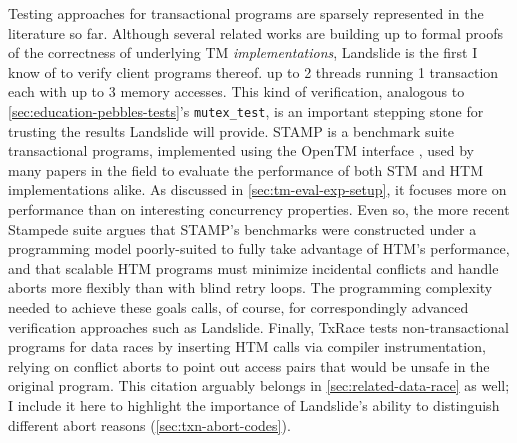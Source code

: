 Testing approaches for transactional programs are sparsely represented in the literature so far.
Although several related works \cite{tm-correctness,tm-completeness,specifying-verifying-tm}
are building up to formal proofs of the correctness of underlying TM {\em implementations},
Landslide is the first I know of to verify client programs thereof.
up to 2 threads running 1 transaction each with up to 3 memory accesses.
This kind of verification,
analogous to \cref{sec:education-pebbles-tests}'s {\tt mutex\_test},
is an important stepping stone for trusting the results Landslide will provide.
STAMP \cite{stamp} is a benchmark suite transactional programs,
implemented using the OpenTM interface \cite{opentm},
used by many papers in the field to evaluate the performance of both STM and HTM implementations alike.
As discussed in \cref{sec:tm-eval-exp-setup},
it focuses more on performance than on interesting concurrency properties.
Even so, the more recent Stampede suite \cite{scalable-tm} argues that STAMP's benchmarks
were constructed under a programming model poorly-suited to fully take advantage of HTM's performance,
and that scalable HTM programs must
minimize incidental conflicts and handle aborts more flexibly than with blind retry loops.
The programming complexity needed to achieve these goals calls,
of course,
for correspondingly advanced verification approaches such as Landslide.
Finally, TxRace \cite{txrace}
tests non-transactional programs for data races
by inserting HTM calls via compiler instrumentation,
relying on conflict aborts to point out access pairs that would be unsafe in the original program.
This citation arguably belongs in \cref{sec:related-data-race} as well;
I include it here to highlight the importance of Landslide's
ability to distinguish different abort reasons (\cref{sec:txn-abort-codes}).

